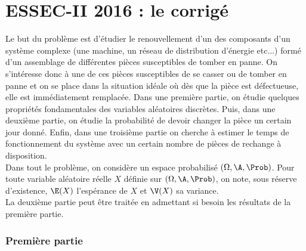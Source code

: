 \chapter*{ESSEC-II 2016 : le corrigé}
  
%

\noindent
Le but du problème est d'étudier le renouvellement d'un des composants 
d'un système complexe (une machine, un réseau de distribution d'énergie 
etc...) formé d'un assemblage de différentes pièces susceptibles de 
tomber en panne. On s'intéresse donc à une de ces pièces susceptibles de 
se casser ou de tomber en panne et on se place dans la situation idéale 
où dès que la pièce est défectueuse, elle est immédiatement remplacée. 
Dans une première partie, on étudie quelques propriétés fondamentales 
des variables aléatoires discrètes. Puis, dans une deuxième partie, on 
étudie la probabilité de devoir changer la pièce un certain jour donné. 
Enfin, dans une troisième partie on cherche à estimer le temps de 
fonctionnement du système avec un certain nombre de pièces de rechange à 
disposition.\\
Dans tout le problème, on considère un espace probabilisé $(\Omega, 
\A, \Prob)$. Pour toute variable aléatoire réelle $X$ définie sur 
$(\Omega, \A, \Prob)$, on note, sous réserve d'existence, $\E(X)$ 
l'espérance de $X$ et $\V(X)$ sa variance.\\
La deuxième partie peut être traitée en admettant si besoin les 
résultats de la première partie.

\subsection*{Première partie}

